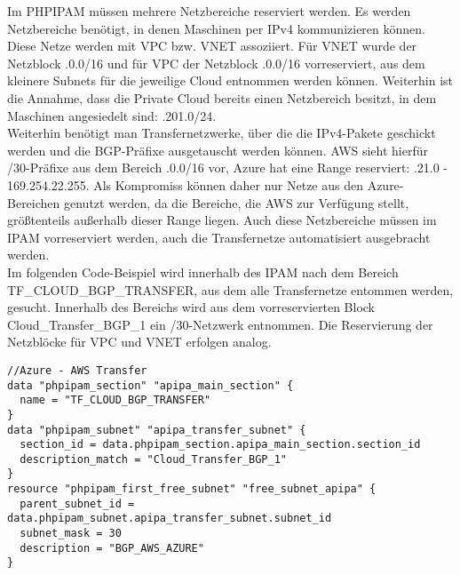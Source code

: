 Im PHPIPAM müssen mehrere Netzbereiche reserviert werden. Es werden Netzbereiche benötigt, in denen Maschinen per IPv4 kommunizieren können. Diese Netze werden mit VPC bzw. VNET assoziiert. Für VNET wurde der Netzblock .0.0/16\grqq{} und für VPC der Netzblock .0.0/16\grqq{} vorreserviert, aus dem kleinere {Subnets} für die jeweilige Cloud entnommen werden können. Weiterhin ist die Annahme, dass die Private Cloud bereits einen Netzbereich besitzt, in dem Maschinen angesiedelt sind: .201.0/24.\grgg{}\\
Weiterhin benötigt man {Transfernetzwerke}, über die die IPv4-Pakete geschickt werden und die BGP-Präfixe ausgetauscht werden können. AWS sieht hierfür /30-Präfixe aus dem Bereich .0.0/16\grqq{} vor, Azure hat eine Range reserviert: .21.0 - 169.254.22.255\grqq{}. Als Kompromiss können daher nur Netze aus den Azure-Bereichen genutzt werden, da die Bereiche, die AWS zur Verfügung stellt, größtenteils außerhalb dieser Range liegen. Auch diese Netzbereiche müssen im IPAM vorreserviert werden, auch die Transfernetze automatisiert ausgebracht werden.\\
Im folgenden Code-Beispiel wird innerhalb des IPAM nach dem Bereich \glqq TF\_CLOUD\_BGP\_TRANSFER\grqq{}, aus dem alle Transfernetze entommen werden, gesucht. Innerhalb des Bereichs wird aus dem vorreservierten Block \glqq Cloud\_Transfer\_BGP\_1\grqq{} ein /30-Netzwerk entnommen. Die Reservierung der Netzblöcke für VPC und VNET erfolgen analog.
\begin{lstlisting}[label=network-reservation-ip,caption=Die data-Anweisungen dienen ausschließlich der Suche nach dem passenden Transfernetzwerk-Block. Per resource-Anweisung wird ein /30-Netzwerk reserviert.]
//Azure - AWS Transfer
data "phpipam_section" "apipa_main_section" {
  name = "TF_CLOUD_BGP_TRANSFER"
}
data "phpipam_subnet" "apipa_transfer_subnet" {
  section_id = data.phpipam_section.apipa_main_section.section_id
  description_match = "Cloud_Transfer_BGP_1"
} 
resource "phpipam_first_free_subnet" "free_subnet_apipa" {
  parent_subnet_id = data.phpipam_subnet.apipa_transfer_subnet.subnet_id
  subnet_mask = 30
  description = "BGP_AWS_AZURE"
}
\end{lstlisting}

